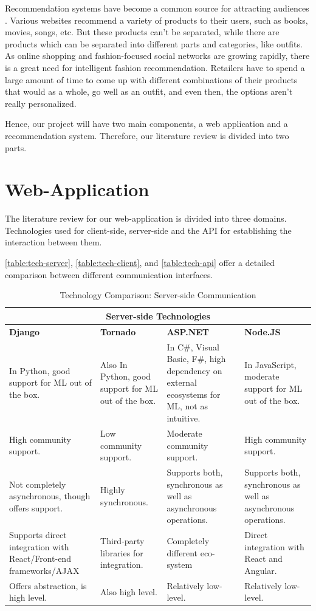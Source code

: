
Recommendation systems have become a common source for attracting audiences \cite{salesforce}. Various websites recommend a variety of products to their users, such as books, movies, songs, etc. But these products can’t be separated, while there are products which can be separated into different parts and categories, like outfits. As online shopping and fashion-focused social networks are growing rapidly, there is a great need for intelligent fashion recommendation. Retailers have to spend a large amount of time to come up with different combinations of their products that would as a whole, go well as an outfit, and even then, the options aren’t really personalized. \newline

Hence, our project will have two main components, a web application and a recommendation system. Therefore, our literature review is divided into two parts.

\section{Web-Application}
The literature review for our web-application is divided into three domains. Technologies used for client-side, server-side and the API for establishing the interaction between them. \newline

 \autoref{table:tech-server}, \autoref{table:tech-client}, and \autoref{table:tech-api} offer a detailed comparison between different communication interfaces.
 
\begin{table}[H]
\begin{tabular}{ @{}|p{4cm}|p{3cm}|p{4cm}|p{3cm}|  }
 \hline
 \multicolumn{4}{|c|}{\textbf{Server-side Technologies}} \\
 \hline
 \textbf{Django} & \textbf{Tornado} & \textbf{ASP.NET} & \textbf{Node.JS}\\
 \hline
 In Python, good support for ML out of the box.   & Also In Python, good support for ML out of the box.    & In C\#, Visual Basic, F\#, high dependency on external ecosystems for ML, not as intuitive. & In JavaScript, moderate support for ML out of the box.\\
  \hline
 High community support.&   Low community support.  & Moderate community support. & High community support.\\
  \hline
Not completely asynchronous, though offers support. &  Highly synchronous. & Supports both, synchronous as well as asynchronous operations. & Supports both, synchronous as well as asynchronous operations. \\
  \hline
Supports direct integration with React/Front-end frameworks/AJAX & Third-party libraries for integration. & Completely different eco-system & Direct integration with React and Angular.\\
 \hline
 Offers abstraction, is high level. & Also high level.  & Relatively low-level. & Relatively low-level.\\
 \hline
\end{tabular}
\caption{Technology Comparison: Server-side Communication \cite{paperDjango} \cite{paperSERP}}
\label{table:tech-server}
\end{table}

